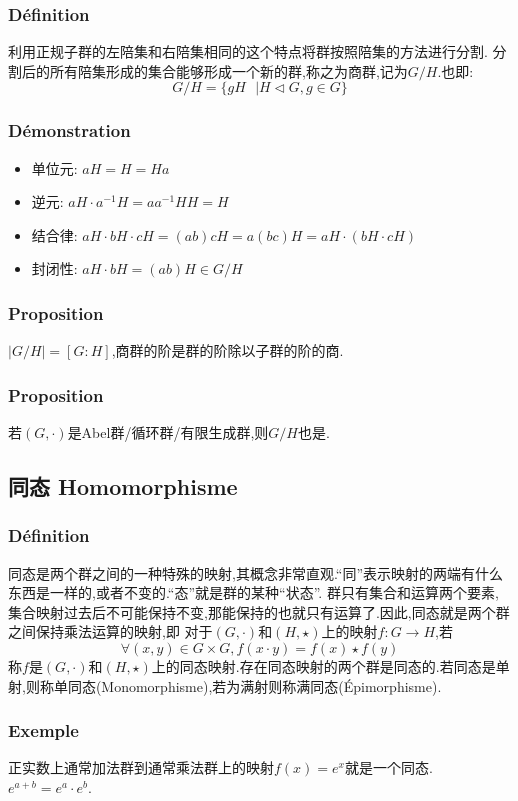\documentclass[12pt, a4paper, oneside]{ctexbook}
\begin{document}
  \subsubsection{Définition}
  利用正规子群的左陪集和右陪集相同的这个特点将群按照陪集的方法进行分割.
  分割后的所有陪集形成的集合能够形成一个新的群,称之为商群,记为$G/H$.也即:
  $$
  G/H=\{gH\text{ }|H\lhd G,g\in G \}
  $$
  \subsubsection{Démonstration}
  \begin{itemize}
    \item 单位元: $aH=H=Ha$
    \item 逆元: $aH\cdot a^{-1}H=aa^{-1}HH=H$
    \item 结合律: $aH\cdot bH\cdot cH=(ab)cH=a(bc)H=aH\cdot(bH\cdot cH) $
    \item 封闭性: $aH\cdot bH=(ab)H\in G/H $
  \end{itemize}
  \subsubsection{Proposition}
  $|G/H|=[G:H]$,商群的阶是群的阶除以子群的阶的商.
  \subsubsection{Proposition}
  若$(G,\cdot)$是Abel群/循环群/有限生成群,则$G/H$也是.

  \subsection{同态 Homomorphisme}    \label{myref:Homomorphisme}
  \subsubsection{Définition}
  同态是两个群之间的一种特殊的映射,其概念非常直观.“同”表示映射的两端有什么东西是一样的,或者不变的.“态”就是群的某种“状态”.
  群只有集合和运算两个要素,集合映射过去后不可能保持不变,那能保持的也就只有运算了.因此,同态就是两个群之间保持乘法运算的映射,即
  对于$(G,\cdot)$和$(H,\star)$上的映射$f:G\rightarrow H $,若
  $$
    \forall (x,y)\in G\times G,f(x\cdot y)=f(x)\star f(y)
  $$称$f$是$(G,\cdot)$和$(H,\star)$上的同态映射.存在同态映射的两个群是同态的.若同态是单射,则称单同态(Monomorphisme),若为满射则称满同态(Épimorphisme).
  \subsubsection{Exemple}
  正实数上通常加法群到通常乘法群上的映射$f(x)=e^x$就是一个同态.$e^{a+b}=e^a\cdot e^b$.
\end{document}
